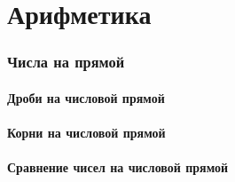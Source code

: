 \part{Арифметика}
\section{Числа на прямой}
\subsection{Дроби на числовой прямой}
	
\subsection{Корни на числовой прямой}
	
\subsection{Сравнение чисел на числовой прямой}
